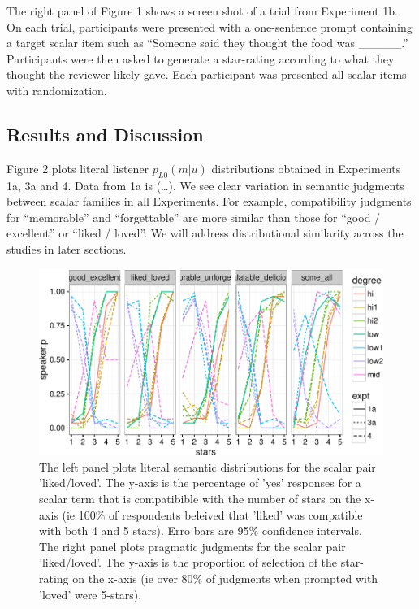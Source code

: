 \documentclass[10pt, letterpaper]{article}
\newenvironment{CodeChunk}{}{}
\begin{document}
The right panel of Figure 1 shows a screen shot of a trial from
Experiment 1b. On each trial, participants were presented with a
one-sentence prompt containing a target scalar item such as ``Someone
said they thought the food was \_\_\_\_\_.'' Participants were then
asked to generate a star-rating according to what they thought the
reviewer likely gave. Each participant was presented all scalar items
with randomization.

\subsection{Results and Discussion}\label{results-and-discussion}

Figure 2 plots literal listener \(p_{L0}(m|u)\) distributions obtained
in Experiments 1a, 3a and 4. Data from 1a is (\ldots{}). We see clear
variation in semantic judgments between scalar families in all
Experiments. For example, compatibility judgments for ``memorable'' and
``forgettable'' are more similar than those for ``good / excellent'' or
``liked / loved''. We will address distributional similarity across the
studies in later sections.

\begin{CodeChunk}
\captionsetup{width=0.8\textwidth}\begin{figure}[t]

{\centering \includegraphics{figs/exp1Plots-1} 

}

\caption[The left panel plots literal semantic distributions for the scalar pair 'liked/loved']{The left panel plots literal semantic distributions for the scalar pair 'liked/loved'. The y-axis is the percentage of 'yes' responses for a scalar term that is compatibible with the number of stars on the x-axis (ie 100\% of respondents beleived that 'liked' was compatible with both 4 and 5 stars). Erro bars are 95\% confidence intervals. The right panel plots pragmatic judgments for the scalar pair 'liked/loved'. The y-axis is the proportion of selection of the star-rating on the x-axis (ie over 80\% of judgments when prompted with 'loved' were 5-stars).}\label{fig:exp1Plots}
\end{figure}
\end{CodeChunk}
\end{document}
